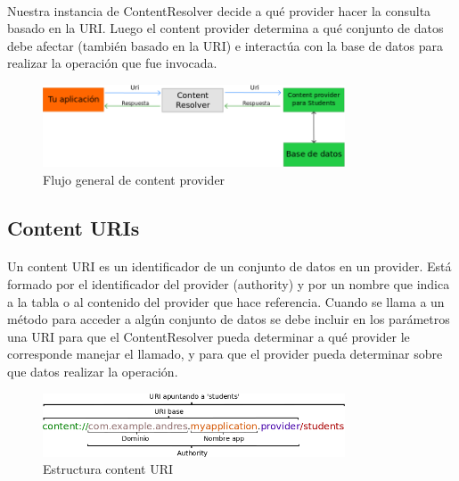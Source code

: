 \documentclass[10pt]{extarticle}
\begin{document}
\paragraph{}
Nuestra instancia de ContentResolver decide a qué provider hacer la consulta basado en la URI. Luego el content provider determina a qué conjunto de datos debe afectar (también basado en la URI) e interactúa con la base de datos para realizar la operación que fue invocada.
\begin{figure}[H]
    \centering
    \includegraphics[width=0.8\textwidth]{ContentProviderGeneral.png}
    \caption{Flujo general de content provider}
    \label{fig:flujo_content_provider}
\end{figure}



\subsection{Content URIs}

\paragraph{}
Un content URI es un identificador de un conjunto de datos en un provider. Está formado por el identificador del provider (authority) y por un nombre que indica a la tabla o al contenido del provider que hace referencia. Cuando se llama a un método para acceder a algún conjunto de datos se debe incluir en los parámetros una URI para que el ContentResolver pueda determinar a qué provider le corresponde manejar el llamado, y para que el provider pueda determinar sobre que datos realizar la operación.

\begin{figure}[H]
    \centering
    \includegraphics[width=0.8\textwidth]{provider_uri_explicacion.png}
    \caption{Estructura content URI}
    \label{fig:estructura_content_URI}
\end{figure}
\end{document}
